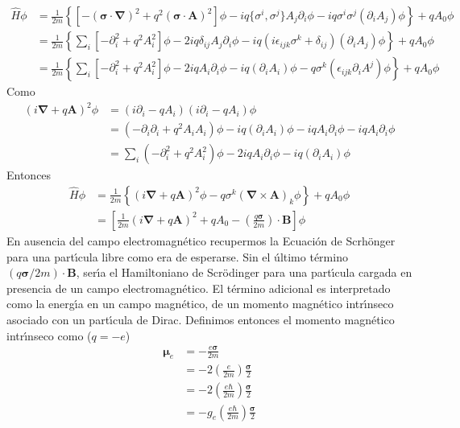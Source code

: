 \begin{align}
 \widehat{H}\phi &=\frac{1}{2m}\left\{[-(\boldsymbol{\sigma}\cdot\boldsymbol{\nabla})^2+q^2(\boldsymbol{\sigma}\cdot\mathbf{A})^2]\phi
    -i q\{\sigma^i,\sigma^j\} A_j \partial_i\phi-i q \sigma^i\sigma^j (\partial_i A_j)\phi\right\}+q A_0\phi\nonumber\\
    &=\frac{1}{2m}\left\{\sum_i[-\partial_i^2+q^2 A_i^2]\phi
     -2i q \delta_{ij} A_j \partial_i\phi-i q (i\epsilon_{ijk}\sigma^k+\delta_{ij})(\partial_i A_j) \phi\right\}+q A_0\phi\nonumber\\
    &=\frac{1}{2m}\left\{\sum_i[-\partial_i^2+q^2 A_i^2]\phi
     -2i q  A_i \partial_i\phi-i q(\partial_i A_i)\phi- q \sigma^k(\epsilon_{ijk}\partial_i A^j) \phi\right\}+q A_0\phi\nonumber
 \end{align}
Como
\begin{align}
  (i\boldsymbol{\nabla}+q\mathbf{A})^2\phi&=(i\partial_i-q A_i)(i\partial_i-q A_i)\phi\nonumber\\
  &=(-\partial_i\partial_i+q^2A_iA_i)\phi-i q(\partial_i A_i)\phi-i q A_i \partial_i\phi-i q A_i \partial_i\phi\nonumber\\
  &=\sum_i(-\partial_i^2+q^2A_i^2)\phi-2i q A_i \partial_i\phi-i q(\partial_i A_i)\phi
\end{align}
Entonces
\begin{align}
  \widehat{H}\phi&=\frac{1}{2m}\left\{(i\boldsymbol{\nabla}+q\mathbf{A})^2\phi
    -q \sigma^k(\boldsymbol{\nabla}\times\mathbf{A})_k \phi\right\}+q A_0\phi\nonumber\\
  &=\left[\frac{1}{2m}(i\boldsymbol{\nabla}+q \mathbf{A})^2+q A_0-\left(\frac{q\boldsymbol{\sigma}}{2m}\right)\cdot\mathbf{B}\right]\phi
\end{align}
En ausencia del campo electromagn\'etico recupermos la Ecuaci\'on de Scrh\"onger para una part\'\i cula libre como era de esperarse. Sin el \'ultimo t\'ermino $({q\boldsymbol{\sigma}}/{2m})\cdot\mathbf{B}$, ser\'\i a el Hamiltoniano de Scr\"odinger para una part\'\i cula cargada en presencia de un campo electromagn\'etico. El t\'ermino adicional es interpretado como la energ\'\i a en un campo magn\'etico, de un momento magn\'etico intr\'\i nseco asociado con un part\'\i cula de Dirac. Definimos entonces el momento magn\'etico intr\'\i nseco como ($q=-e$)
\begin{align}
  \boldsymbol{\mu}_e&=-\frac{e\boldsymbol{\sigma}}{2m}\nonumber\\
  &=-2\left(\frac{e}{2m}\right)\frac{\boldsymbol{\sigma}}{2}\nonumber\\
  &=-2\left(\frac{e\hbar}{2m}\right)\frac{\boldsymbol{\sigma}}{2}\nonumber\\
  &=-g_e\left(\frac{e\hbar}{2m}\right)\frac{\boldsymbol{\sigma}}{2}\nonumber\\
\end{align}
